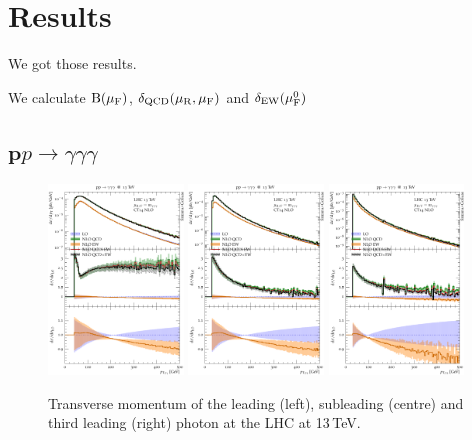 \section{Results}
\label{sec:results}

We got those results.

We calculate $\mathrm{B}(\mu_{\mathrm{F}})$, $\delta_\text{QCD}(\mu_{\mathrm{R}},\mu_{\mathrm{F}})$ and 
$\delta_\text{EW}(\mu_{\mathrm{F}}^0)$

\subsection{\texorpdfstring{$\boldsymbol pp\to \gamma\gamma\gamma$}{pp->aaa}}

\begin{figure}[t!]
  \centering
  \includegraphics[width=0.32\textwidth]{figs_aaa/pT_y1}
  \includegraphics[width=0.32\textwidth]{figs_aaa/pT_y2}
  \includegraphics[width=0.32\textwidth]{figs_aaa/pT_y3}
  \caption{
    Transverse momentum of the leading (left), subleading (centre) 
    and third leading (right) photon at the LHC at 13\,TeV.
    \label{fig:aaa:pt}
  }
\end{figure}

